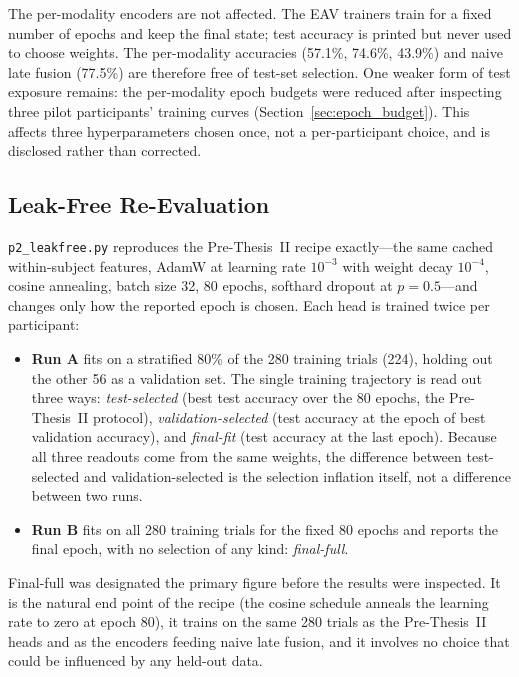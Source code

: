 The per-modality encoders are not affected. The EAV trainers train for a fixed number of
epochs and keep the final state; test accuracy is printed but never used to choose
weights. The per-modality accuracies (57.1\%, 74.6\%, 43.9\%) and naive late fusion
(77.5\%) are therefore free of test-set selection. One weaker form of test exposure
remains: the per-modality epoch budgets were reduced after inspecting three pilot
participants' training curves (Section~\ref{sec:epoch_budget}). This affects three
hyperparameters chosen once, not a per-participant choice, and is disclosed rather
than corrected.

\subsection{Leak-Free Re-Evaluation}

\texttt{p2\_leakfree.py} reproduces the Pre-Thesis~II recipe exactly---the same cached
within-subject features, AdamW at learning rate $10^{-3}$ with weight decay
$10^{-4}$, cosine annealing, batch size 32, 80 epochs, softhard dropout at $p = 0.5$---and
changes only how the reported epoch is chosen. Each head is trained twice per
participant:
\begin{itemize}
  \item \textbf{Run A} fits on a stratified 80\% of the 280 training trials (224),
  holding out the other 56 as a validation set. The single training trajectory is read
  out three ways: \emph{test-selected} (best test accuracy over the 80 epochs, the
  Pre-Thesis~II protocol), \emph{validation-selected} (test accuracy at the epoch of
  best validation accuracy), and \emph{final-fit} (test accuracy at the last epoch).
  Because all three readouts come from the same weights, the difference between
  test-selected and validation-selected is the selection inflation itself, not a
  difference between two runs.
  \item \textbf{Run B} fits on all 280 training trials for the fixed 80 epochs and
  reports the final epoch, with no selection of any kind: \emph{final-full}.
\end{itemize}

Final-full was designated the primary figure before the results were inspected. It is
the natural end point of the recipe (the cosine schedule anneals the learning rate to
zero at epoch 80), it trains on the same 280 trials as the Pre-Thesis~II heads and as
the encoders feeding naive late fusion, and it involves no choice that could be
influenced by any held-out data.

